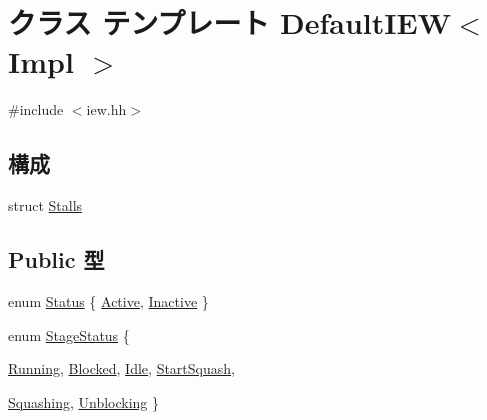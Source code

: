 \hypertarget{classDefaultIEW}{
\section{クラス テンプレート DefaultIEW$<$ Impl $>$}
\label{classDefaultIEW}
}


{\ttfamily \#include $<$iew.hh$>$}\subsection*{構成}
\begin{DoxyCompactItemize}
\item 
struct \hyperlink{structDefaultIEW_1_1Stalls}{Stalls}
\end{DoxyCompactItemize}
\subsection*{Public 型}
\begin{DoxyCompactItemize}
\item 
enum \hyperlink{classDefaultIEW_a67a0db04d321a74b7e7fcfd3f1a3f70b}{Status} \{ \hyperlink{classDefaultIEW_a67a0db04d321a74b7e7fcfd3f1a3f70ba26bd8444261cc58df7a86753c79d2520}{Active}, 
\hyperlink{classDefaultIEW_a67a0db04d321a74b7e7fcfd3f1a3f70ba969c924a722daf6334fca64346092ae6}{Inactive}
 \}
\item 
enum \hyperlink{classDefaultIEW_add44b42ba3608b213fc0986c4aee6018}{StageStatus} \{ \par
\hyperlink{classDefaultIEW_add44b42ba3608b213fc0986c4aee6018a2f5f2c4a8c4f4f0519d503dcdfbf55cb}{Running}, 
\hyperlink{classDefaultIEW_add44b42ba3608b213fc0986c4aee6018a9463ee9b8700258a1019b4b9d2d77a30}{Blocked}, 
\hyperlink{classDefaultIEW_add44b42ba3608b213fc0986c4aee6018ad3fa9ae9431d6cb1772f9d9df48cab19}{Idle}, 
\hyperlink{classDefaultIEW_add44b42ba3608b213fc0986c4aee6018a19a48e232b72697e4bb7ea1b6075ed49}{StartSquash}, 
\par
\hyperlink{classDefaultIEW_add44b42ba3608b213fc0986c4aee6018a22a648855197e326dc88f548634c0ec7}{Squashing}, 
\hyperlink{classDefaultIEW_add44b42ba3608b213fc0986c4aee6018af2a3acf850890cb1651bc41dcbacb7e0}{Unblocking}
 \}
\end{DoxyCompactItemize}
